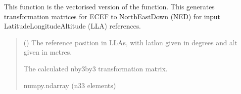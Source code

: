 \documentclass[letterpaper,10pt,english]{sphinxmanual}
\begin{document}
\begin{fulllineitems}
\label{\detokenize{modules/util/transformations:qnav.util.transformations.ecef2ned_transform_vec}}
\pysigstartsignatures
{}
\pysigstopsignatures
\sphinxAtStartPar
This function is the vectorised version of the
{\hyperref[\detokenize{modules/util/transformations:qnav.util.transformations.ecef2ned_transform}]{}}
function. This generates transformation matrices for ECEF to
North\sphinxhyphen{}East\sphinxhyphen{}Down (NED) for input Latitude\sphinxhyphen{}Longitude\sphinxhyphen{}Altitude (LLA)
references.
\begin{quote}\begin{description}
\sphinxAtStartPar
{} (\sphinxstyleliteralemphasis{\sphinxupquote{ (}}\sphinxstyleliteralemphasis{\sphinxupquote{)}}) \textendash{} The reference position in LLAs, with lat\sphinxhyphen{}lon given in
degrees and alt given in metres.

\sphinxAtStartPar
The calculated n\sphinxhyphen{}by\sphinxhyphen{}3\sphinxhyphen{}by\sphinxhyphen{}3 transformation matrix.

\sphinxAtStartPar
numpy.ndarray (n\sphinxhyphen{}3\sphinxhyphen{}3 elements)

\end{description}\end{quote}

\end{fulllineitems}

\end{document}

